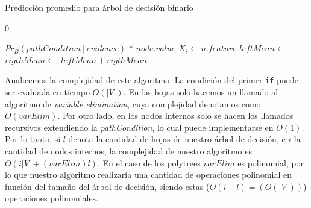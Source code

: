\begin{algorithm}
\caption{Predicción promedio para árbol de decisión binario} \label{alg:meanPredBinDT}
\begin{algorithmic}[1]
        \State \Return  $0$
    \EndIf
    
        \State \Return  $Pr_B(pathCondition\ | \ evidence)$ * $node.value$
    \EndIf
    \State $X_i \gets n.feature$
    \State $leftMean \gets$  
    \State $rigthMean\gets$  
    \State \Return  \mbox{$leftMean + rigthMean$}
\EndFunction
\end{algorithmic}
\end{algorithm}

Analicemos la complejidad de este algoritmo. La condición del primer \texttt{if} puede ser evaluada en tiempo $O(|V|)$. En las hojas solo hacemos un llamado al algoritmo de \textit{variable elimination}, cuya complejidad denotamos como $O(varElim)$. Por otro lado, en los nodos internos solo se hacen los llamados recursivos extendiendo la \textit{pathCondition}, lo cual puede implementarse en $O(1)$. Por lo tanto, si $l$ denota la cantidad de hojas de nuestro árbol de decisión, e $i$ la cantidad de nodos internos, la complejidad de nuestro algoritmo es $O(i|V| + (varElim)l)$. En el caso de los polytrees $varElim$ es polinomial, por lo que nuestro algoritmo realizaría una cantidad de operaciones polinomial en función del tamaño del árbol de decisión, siendo estas ($O(i + l) = (O(|V|))$) operaciones polinomiales. %






